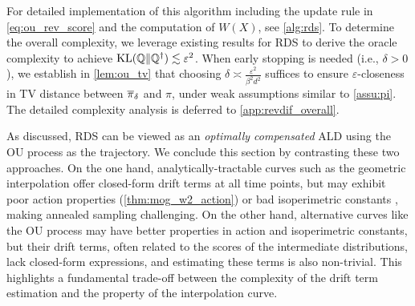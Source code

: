 For detailed implementation of this algorithm including the update rule in \cref{eq:ou_rev_score} and the computation of $W(X)$, see \cref{alg:rds}. To determine the overall complexity, we leverage existing results for RDS \citep{huang2024reverse,huang2024faster,he2024zeroth,vacher2025polynomial} to derive the oracle complexity to achieve $\operatorname{KL}(\mathbb{Q}\|\mathbb{Q}^\dagger)\lesssim\varepsilon^2$. When early stopping is needed (i.e., $\delta>0$), we establish in \cref{lem:ou_tv} that choosing $\delta\asymp\frac{\varepsilon^2}{\beta^2d^2}$ suffices to ensure $\varepsilon$-closeness in TV distance between $\overline{\pi}_\delta$ and $\pi$, under weak assumptions similar to \cref{assu:pi}. The detailed complexity analysis is deferred to \cref{app:revdif_overall}.

As discussed, RDS can be viewed as an \emph{optimally compensated} ALD using the OU process as the trajectory. We conclude this section by contrasting these two approaches. On the one hand, analytically-tractable curves such as the geometric interpolation offer closed-form drift terms at all time points, but may exhibit poor action properties (\cref{thm:mog_w2_action}) or bad isoperimetric constants \citep{chehab2025provable}, making annealed sampling challenging. On the other hand, alternative curves like the OU process may have better properties in action and isoperimetric constants, but their drift terms, often related to the scores of the intermediate distributions, lack closed-form expressions, and estimating these terms is also non-trivial. This highlights a fundamental trade-off between the complexity of the drift term estimation and the property of the interpolation curve. 